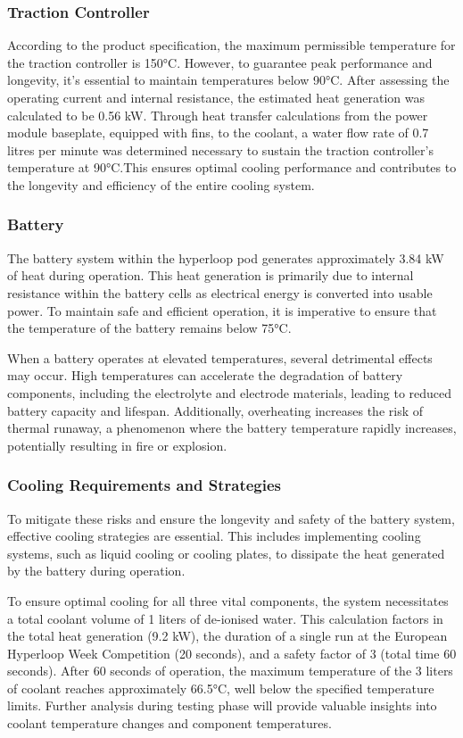 \subsubsection{ Traction Controller}

According to the product specification, the maximum permissible temperature for the traction controller is 150°C. However, to guarantee peak performance and longevity, it's essential to maintain temperatures below 90°C. After assessing the operating current and internal resistance, the estimated heat generation was calculated to be 0.56 kW. Through heat transfer calculations from the power module baseplate, equipped with fins, to the coolant, a water flow rate of 0.7 litres per minute was determined necessary to sustain the traction controller's temperature at 90°C.This ensures optimal cooling performance and contributes to the longevity and efficiency of the entire cooling system.
\subsubsection{ Battery}
The battery system within the hyperloop pod generates approximately 3.84 kW of heat during operation. This heat generation is primarily due to internal resistance within the battery cells as electrical energy is converted into usable power. To maintain safe and efficient operation, it is imperative to ensure that the temperature of the battery remains below 75°C.

When a battery operates at elevated temperatures, several detrimental effects may occur. High temperatures can accelerate the degradation of battery components, including the electrolyte and electrode materials, leading to reduced battery capacity and lifespan. Additionally, overheating increases the risk of thermal runaway, a phenomenon where the battery temperature rapidly increases, potentially resulting in fire or explosion.


\subsubsection{Cooling Requirements and Strategies}
To mitigate these risks and ensure the longevity and safety of the battery system, effective cooling strategies are essential. This includes implementing cooling systems, such as liquid cooling or cooling plates, to dissipate the heat generated by the battery during operation.

To ensure optimal cooling for all three vital components, the system necessitates a total coolant volume of 1 liters of de-ionised water. This calculation factors in the total heat generation (9.2 kW), the duration of a single run at the European Hyperloop Week Competition (20 seconds), and a safety factor of 3 (total time 60 seconds). After 60 seconds of operation, the maximum temperature of the 3 liters of coolant reaches approximately 66.5°C, well below the specified temperature limits. Further analysis during testing phase will provide valuable insights into coolant temperature changes and component temperatures.

